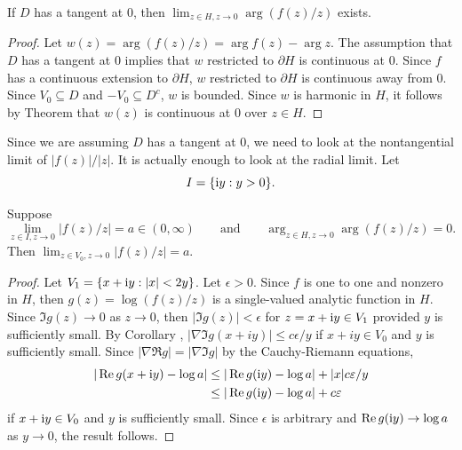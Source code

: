 \begin{proposition}\label{prop:ch5_5.2}
If $D$ has a tangent at $0$, then $\lim_{z \in H,z \to 0} \arg(f(z)/z)$ exists.
\end{proposition}

\begin{proof}
Let $w(z) = \arg(f(z)/z) = \arg f(z) - \arg z$. The assumption that $D$ has a tangent at $0$ implies that $w$ restricted to $\partial H$ is continuous at $0$. Since $f$ has a continuous extension to $\partial H$, $w$ restricted to $\partial H$ is continuous away from $0$. Since $V_0 \subseteq D$ and $-V_0 \subseteq D^c$, $w$ is bounded. Since $w$ is harmonic in $H$, it follows by Theorem  that $w(z)$ is continuous at $0$ over $z \in H$.
\end{proof}

Since we are assuming $D$ has a tangent at 0, we need to look at the nontangential limit of $|f(z)|/|z|$. It is actually enough to look at the radial limit. Let
\begin{equation}\label{eq:ch5_5.4}
    I = \{\mathrm{i} y : y > 0\}.
\end{equation}

\begin{proposition}\label{prop:ch5_5.3}
Suppose
\[
    \lim_{z \in I,z \to 0} |f(z)/z| = a \in (0,\infty) \qquad \text{and} \qquad \arg_{z \in H,z \to 0} \arg(f(z)/z) = 0.
\]
Then $\lim_{z \in V_0,z \to 0} |f(z)/z| = a$.
\end{proposition}

\begin{proof}
Let $V_1 = \{x + \mathrm{i} y : |x| < 2y\}$. Let $\epsilon > 0$. Since $f$ is one to one and nonzero in $H$, then $g(z) = \log(f(z)/z)$ is a single-valued analytic function in $H$. Since $\Im g(z) \to 0$ as $z \to 0$, then $|\Im g(z)| < \epsilon$ for $z = x + \mathrm{i} y \in V_1$ provided $y$ is sufficiently small. By Corollary , $|\nabla\Im g(x + iy)| \leq c\epsilon/y$ if $x + iy \in V_0$ and $y$ is sufficiently small. Since $|\nabla\Re g| = |\nabla\Im g|$ by the Cauchy-Riemann equations,
\begin{align*}
    |\operatorname{Re} g(x + \mathrm{i} y) - \log a| &\leq |\operatorname{Re} g(\mathrm{i} y) - \log a| + |x|c\varepsilon/y \\
    &\leq |\operatorname{Re} g(\mathrm{i} y) - \log a| + c\varepsilon
\end{align*}
if $x+\mathrm{i} y \in V_0$ and $y$ is sufficiently small. Since $\epsilon$ is arbitrary and $\operatorname{Re} g(\mathrm{i} y) \to \log a$ as $y \to 0$, the result follows.
\end{proof}

